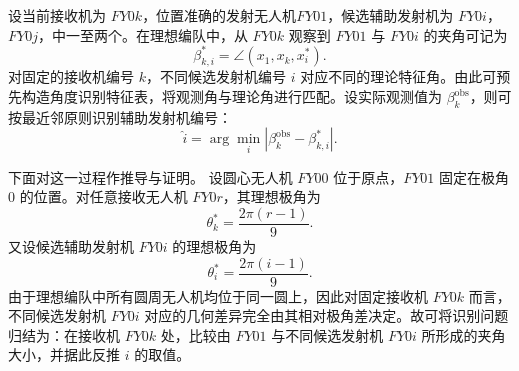 \documentclass[UTF-8,a4paper,zihao=-4]{ctexart}
\begin{document}
设当前接收机为 $FY0k$，位置准确的发射无人机$FY01$，候选辅助发射机为 $FY0i$，$FY0j$，中一至两个。在理想编队中，从 $FY0k$ 观察到 $FY01$ 与 $FY0i$ 的夹角可记为
\begin{equation}
\beta_{k,i}^{*}=
\angle\left(x_1^{},x_k^{},x_i^{*}\right).
\end{equation}
对固定的接收机编号 $k$，不同候选发射机编号 $i$ 对应不同的理论特征角。由此可预先构造角度识别特征表，将观测角与理论角进行匹配。设实际观测值为 $\beta_k^{\mathrm{obs}}$，则可按最近邻原则识别辅助发射机编号：
\begin{equation}
\hat{i}=
\arg\min_{i} \left| \beta_k^{\mathrm{obs}}-\beta_{k,i}^{*} \right|.
\end{equation}

下面对这一过程作推导与证明。
设圆心无人机 $FY00$ 位于原点，$FY01$ 固定在极角 $0$ 的位置。对任意接收无人机 $FY0r$，其理想极角为
\begin{equation}
\theta_k^{*}=\frac{2\pi(r-1)}{9}.
\end{equation}
又设候选辅助发射机 $FY0i$ 的理想极角为
\begin{equation}
\theta_i^{*}=\frac{2\pi(i-1)}{9}.
\end{equation}
由于理想编队中所有圆周无人机均位于同一圆上，因此对固定接收机 $FY0k$ 而言，不同候选发射机 $FY0i$ 对应的几何差异完全由其相对极角差决定。故可将识别问题归结为：在接收机 $FY0k$ 处，比较由 $FY01$ 与不同候选发射机 $FY0i$ 所形成的夹角大小，并据此反推 $i$ 的取值。
\end{document}
